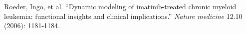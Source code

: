 \documentclass[12pt]{article}
\begin{document}
\newpage

\begin{thebibliography}{9}
  Roeder, Ingo, et al. ``Dynamic modeling of imatinib-treated chronic myeloid leukemia: functional insights and clinical implications.'' {\itshape Nature medicine} 12.10 (2006): 1181-1184.
\end{thebibliography}
\newpage

\end{document}
